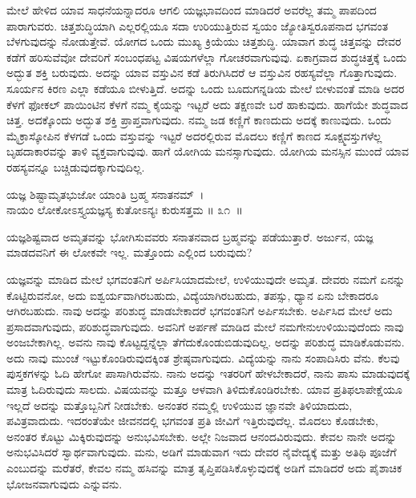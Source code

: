 ಮೇಲೆ ಹೇಳಿದ ಯಾವ ಸಾಧನೆಯನ್ನಾದರೂ ಆಗಲಿ ಯಜ್ಞಭಾವದಿಂದ ಮಾಡಿದರೆ ಅವರೆಲ್ಲ ತಮ್ಮ ಪಾಪದಿಂದ ಪಾರಾಗುವರು. ಚಿತ್ತಶುದ್ಧಿಯಾಗಿ ಎಲ್ಲರಲ್ಲಿಯೂ ಸದಾ ಉರಿಯುತ್ತಿರುವ ಸ್ವಯಂ ಜ್ಯೋತಿಸ್ವರೂಪನಾದ ಭಗವಂತ ಬೆಳಗುವುದನ್ನು ನೋಡುತ್ತೇವೆ. ಯೋಗದ ಒಂದು ಮುಖ್ಯ ಕ್ರಿಯೆಯು ಚಿತ್ತಶುದ್ಧಿ. ಯಾವಾಗ ಶುದ್ಧ ಚಿತ್ತವನ್ನು ದೇವರ ಕಡೆಗೆ ಹರಿಸುವೆವೋ ದೇವರಿಗೆ ಸಂಬಂಧಪಟ್ಟ ವಿಷಯಗಳೆಲ್ಲಾ ಗೋಚರವಾಗುವುವು. ಏಕಾಗ್ರವಾದ ಶುದ್ಧಚಿತ್ತಕ್ಕೆ ಒಂದು ಅದ್ಭುತ ಶಕ್ತಿ ಬರುವುದು. ಅದನ್ನು ಯಾವ ವಸ್ತುವಿನ ಕಡೆ ತಿರುಗಿಸಿದರೆ ಆ ವಸ್ತುವಿನ ರಹಸ್ಯವೆಲ್ಲಾ ಗೊತ್ತಾಗುವುದು. ಸೂರ್ಯನ ಕಿರಣ ಎಲ್ಲಾ ಕಡೆಯೂ ಬೀಳುತ್ತಿದೆ. ಅದನ್ನು ಒಂದು ಬೂದುಗನ್ನಡಿಯ ಮೇಲೆ ಬೀಳುವಂತೆ ಮಾಡಿ ಅದರ ಕೆಳಗೆ ಫೋಕಲ್ ಪಾಯಿಂಟಿನ ಕೆಳಗೆ ನಮ್ಮ ಕೈಯನ್ನು ಇಟ್ಟರೆ ಅದು ತಕ್ಷಣವೇ ಬರೆ ಹಾಕುವುದು. ಹಾಗೆಯೇ ಶುದ್ಧವಾದ ಚಿತ್ತ. ಅದಕ್ಕೊಂದು ಅದ್ಭುತ ಶಕ್ತಿ ಪ್ರಾಪ್ತವಾಗುವುದು. ನಮ್ಮ ಜಡ ಕಣ್ಣಿಗೆ ಕಾಣದುದು ಅದಕ್ಕೆ ಕಾಣುವುದು. ಒಂದು ಮೈಕ್ರಾಸ್ಕೋಪಿನ ಕೆಳಗಡೆ ಒಂದು ವಸ್ತುವನ್ನು ಇಟ್ಟರೆ ಅದರಲ್ಲಿರುವ ಮೊದಲು ಕಣ್ಣಿಗೆ ಕಾಣದ ಸೂಕ್ಷ್ಮವಸ್ತುಗಳೆಲ್ಲ ಬೃಹದಾಕಾರವನ್ನು ತಾಳಿ ವ್ಯಕ್ತವಾಗುವುವು. ಹಾಗೆ ಯೋಗಿಯ ಮನಸ್ಸಾಗುವುದು. ಯೋಗಿಯ ಮನಸ್ಸಿನ ಮುಂದೆ ಯಾವ ರಹಸ್ಯವನ್ನೂ ಬಚ್ಚಿಡುವುದಕ್ಕಾಗುವುದಿಲ್ಲ.

\begin{shloka}
ಯಜ್ಞ ಶಿಷ್ಟಾಮೃತಭುಜೋ ಯಾಂತಿ ಬ್ರಹ್ಮ ಸನಾತನಮ್~।\\ನಾಯಂ ಲೋಕೋಽಸ್ತ್ಯಯಜ್ಞಸ್ಯ ಕುತೋಽನ್ಯಃ ಕುರುಸತ್ತಮ \hfill॥ ೩೧~॥
\end{shloka}

\begin{artha}
ಯಜ್ಞಶಿಷ್ಟವಾದ ಅಮೃತವನ್ನು ಭೋಗಿಸುವವರು ಸನಾತನವಾದ ಬ್ರಹ್ಮವನ್ನು ಪಡೆಯುತ್ತಾರೆ. ಅರ್ಜುನ, ಯಜ್ಞ ಮಾಡದವನಿಗೆ ಈ ಲೋಕವೇ ಇಲ್ಲ. ಮತ್ತೊಂದು ಎಲ್ಲಿಂದ ಬರುವುದು?
\end{artha}

ಯಜ್ಞವನ್ನು ಮಾಡಿದ ಮೇಲೆ ಭಗವಂತನಿಗೆ ಅರ್ಪಿಸಿಯಾದಮೇಲೆ, ಉಳಿಯುವುದೇ ಅಮೃತ. ದೇವರು ನಮಗೆ ಏನನ್ನು ಕೊಟ್ಟಿರುವನೋ, ಅದು ಐಶ್ವರ್ಯವಾಗಿರಬಹುದು, ವಿದ್ಯೆಯಾಗಿರಬಹುದು, ತಪಸ್ಸು, ಧ್ಯಾನ ಏನು ಬೇಕಾದರೂ ಆಗಿರಬಹುದು. ನಾವು ಅದನ್ನು ಪರಿಶುದ್ಧ ಮಾಡಬೇಕಾದರೆ ಭಗವಂತನಿಗೆ ಅರ್ಪಿಸಬೇಕು. ಅರ್ಪಿಸಿದ ಮೇಲೆ ಅದು ಪ್ರಸಾದವಾಗುವುದು, ಪರಿಶುದ್ಧವಾಗುವುದು. ಅವನಿಗೆ ಅರ್ಪಣೆ ಮಾಡಿದ ಮೇಲೆ ನಮಗೇನು\break ಉಳಿಯುವು\-ದೆಂದು ನಾವು ಅಂಜಬೇಕಾಗಿಲ್ಲ. ಅವನು ನಾವು ಕೊಟ್ಟದ್ದನ್ನೆಲ್ಲಾ ತೆಗೆದುಕೊಂಡು\-ಬಿಡುವುದಿಲ್ಲ. ಅದನ್ನು ಪರಿಶುದ್ಧ ಮಾಡಿಕೊಡುವನು. ಅದು ನಾವು ಮುಂಚೆ ಇಟ್ಟುಕೊಂಡಿರು\-ವುದಕ್ಕಿಂತ ಶ್ರೇಷ್ಠವಾಗುವುದು. ವಿದ್ಯೆಯನ್ನು ನಾನು ಸಂಪಾದಿಸಿರು ವೆನು. ಕೆಲವು ಪುಸ್ತಕಗಳನ್ನು ಓದಿ ಹೇಗೋ ಪಾಸಾಗಿರುವೆನು. ನಾನು ಅದನ್ನು ಇತರರಿಗೆ ಹೇಳಬೇಕಾದರೆ, ನಾನು ಪಾಸು ಮಾಡುವುದಕ್ಕೆ ಮಾತ್ರ ಓದಿರುವುದು ಸಾಲದು. ವಿಷಯವನ್ನು ಮತ್ತೂ ಆಳವಾಗಿ ತಿಳಿದುಕೊಂಡಿರಬೇಕು. ಯಾವ ಪ್ರತಿಫಲಾಪೇಕ್ಷೆಯೂ ಇಲ್ಲದೆ ಅದನ್ನು ಮತ್ತೊಬ್ಬನಿಗೆ ನೀಡಬೇಕು. ಅನಂತರ ನಮ್ಮಲ್ಲಿ ಉಳಿಯುವ ಜ್ಞಾನವೇ ತಿಳಿಯಾದುದು, ಪವಿತ್ರವಾದುದು. ಇದರಂತೆಯೇ ಜೀವನದಲ್ಲಿ ಭಗವಂತ ಪ್ರತಿ ಜೀವಿಗೆ ಇತ್ತಿರುವುದೆಲ್ಲ. ಮೊದಲು ಕೊಡಬೇಕು, ಅನಂತರ ಕೊಟ್ಟು ಮಿಕ್ಕಿರುವುದನ್ನು ಅನುಭವಿಸಬೇಕು. ಅಲ್ಲೇ ನಿಜವಾದ ಆನಂದವಿರುವುದು. ಕೇವಲ ನಾನೇ ಅದನ್ನು ಅನುಭವಿಸಿದರೆ ಸ್ವಾರ್ಥವಾಗುವುದು. ಮನು, ಅಡಿಗೆ ಮಾಡುವಾಗ ಇದು ದೇವರ ನೈವೇದ್ಯಕ್ಕೆ ಮತ್ತು ಅತಿಥಿ ಪೂಜೆಗೆ ಎಂಬುದನ್ನು ಮರೆತರೆ, ಕೇವಲ ನಮ್ಮ ಹಸಿವನ್ನು ಮಾತ್ರ ತೃಪ್ತಿಪಡಿಸಿಕೊಳ್ಳುವುದಕ್ಕೆ ಅಡಿಗೆ ಮಾಡಿದರೆ ಅದು ಪೈಶಾಚಿಕ ಭೋಜನವಾಗುವುದು ಎನ್ನುವನು.

